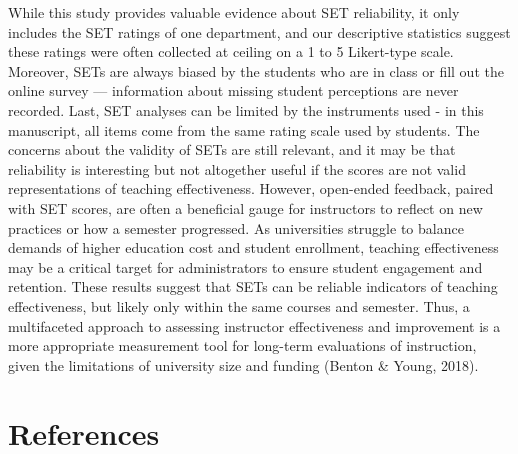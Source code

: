 \documentclass[
  man]{apa7}
\begin{document}
While this study provides valuable evidence about SET reliability, it
only includes the SET ratings of one department, and our descriptive
statistics suggest these ratings were often collected at ceiling on a 1
to 5 Likert-type scale. Moreover, SETs are always biased by the students
who are in class or fill out the online survey --- information about
missing student perceptions are never recorded. Last, SET analyses can
be limited by the instruments used - in this manuscript, all items come
from the same rating scale used by students. The concerns about the
validity of SETs are still relevant, and it may be that reliability is
interesting but not altogether useful if the scores are not valid
representations of teaching effectiveness. However, open-ended feedback,
paired with SET scores, are often a beneficial gauge for instructors to
reflect on new practices or how a semester progressed. As universities
struggle to balance demands of higher education cost and student
enrollment, teaching effectiveness may be a critical target for
administrators to ensure student engagement and retention. These results
suggest that SETs can be reliable indicators of teaching effectiveness,
but likely only within the same courses and semester. Thus, a
multifaceted approach to assessing instructor effectiveness and
improvement is a more appropriate measurement tool for long-term
evaluations of instruction, given the limitations of university size and
funding (Benton \& Young, 2018).

\newpage

\hypertarget{references}{%
\section{References}\label{references}}
\end{document}
